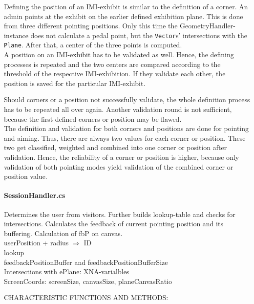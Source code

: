 Defining the position of an \ac{IMI}-exhibit is similar to the definition of a corner. An admin points at the exhibit on the earlier defined exhibition plane. This is done from three different pointing positions. Only this time the GeometryHandler-instance does not calculate a pedal point, but the \texttt{Vector}s' intersections with the \texttt{Plane}. After that, a center of the three points is computed.
\\
A position on an \ac{IMI}-exhibit has to be validated as well. Hence, the defining processes is repeated and the two centers are compared according to the threshold of the respective \ac{IMI}-exhibition. If they validate each other, the position is saved for the particular \ac{IMI}-exhibit. 

Should corners or a position not successfully validate, the whole definition process has to be repeated all over again. Another validation round is not sufficient, because the first defined corners or position may be flawed.
\\
The definition and validation for both corners and positions are done for pointing and aiming. Thus, there are always two values for each corner or position. These two get classified, weighted and combined into one corner or position after validation. Hence, the reliability of a corner or position is higher, because only validation of both pointing modes yield validation of the combined corner or position value.


\paragraph{SessionHandler.cs} Determines the user from visitors. Further builds lookup-table and checks for intersections. Calculates the feedback of current pointing position and its buffering. Calculation of fbP on canvas.
\\
userPosition + radius $\Rightarrow$ ID
\\
lookup
\\
feedbackPositionBuffer and feedbackPositionBufferSize
\\
Intersections with ePlane: XNA-varialbles
\\
ScreenCoords: screenSize, canvasSize, planeCanvasRatio

CHARACTERISTIC FUNCTIONS AND METHODS: 


